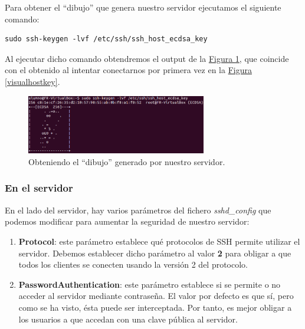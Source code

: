 \documentclass[10pt,a4paper,spanish]{article}
\begin{document}
Para obtener el ``dibujo'' que genera nuestro servidor ejecutamos el siguiente comando:
\begin{verbatim}
sudo ssh-keygen -lvf /etc/ssh/ssh_host_ecdsa_key
\end{verbatim}

Al ejecutar dicho comando obtendremos el output de la \hyperref[visualhostkey1]{Figura \ref*{visualhostkey1}}, que coincide con el obtenido al intentar conectarnos por primera vez en la \hyperref[visualhostkey]{Figura \ref*{visualhostkey}}.

\begin{figure}[!h]
    \centering
    \includegraphics[width=0.7\textwidth]{comprobacion_visualkey}
    \caption{Obteniendo el ``dibujo'' generado por nuestro servidor.}
    \label{visualhostkey1}
\end{figure}

\subsubsection{En el servidor}
En el lado del servidor, hay varios parámetros del fichero \textit{sshd\_config} que podemos modificar para aumentar la seguridad de nuestro servidor:
\begin{enumerate}[$\bullet$]
    \item \textbf{Protocol}: este parámetro establece qué protocolos de SSH permite utilizar el servidor. Debemos establecer dicho parámetro al valor \textbf{2} para obligar a que todos los clientes se conecten usando la versión 2 del protocolo.
    \item \textbf{PasswordAuthentication}: este parámetro establece si se permite o no acceder al servidor mediante contraseña. El valor por defecto es que sí, pero como se ha visto, ésta puede ser interceptada. Por tanto, es mejor obligar a los usuarios a que accedan con una clave pública al servidor.
\end{enumerate}

 

\end{document}
